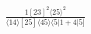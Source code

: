 \documentclass[varwidth, border=5pt]{standalone}
\begin{document}
\begin{my}
$\begin{gathered}
\scriptscriptstyle\frac{1[23]^2⟨25⟩^2}{⟨14⟩[25]⟨45⟩⟨5|1+4|5]}
\end{gathered}$
\end{my}
\end{document}
